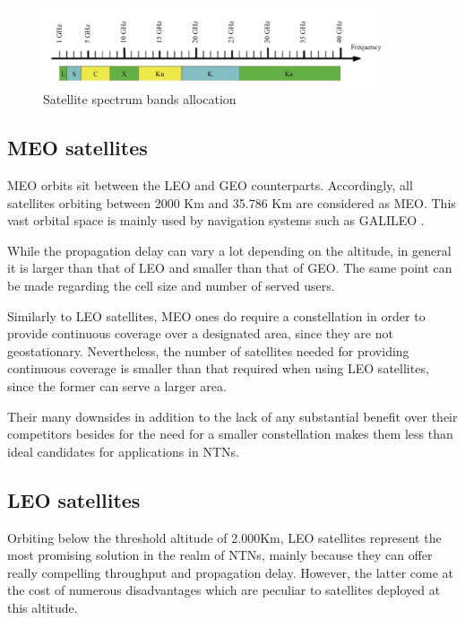 \begin{figure}[ht]
    \centering
    \includegraphics[width=0.9\textwidth]{res/satellite-bands.png}
    \caption{Satellite spectrum bands allocation \cite{advances-comm-sat-sys}}
    \label{fig:satellite-bands}
\end{figure}

\subsection{MEO satellites}
\ac{MEO} orbits sit between the LEO and GEO counterparts. Accordingly, all satellites orbiting between 2000 Km and 35.786 Km are considered as \ac{MEO}. This vast orbital space is mainly used by navigation systems such as GALILEO \cite{types-of-orbits-esa}.

While the propagation delay can vary a lot depending on the altitude, in general it is larger than that of \ac{LEO} and smaller than that of \ac{GEO}. The same point can be made regarding the cell size and number of served users. 

Similarly to \ac{LEO} satellites, \ac{MEO} ones do require a constellation in order to provide continuous coverage over a designated area, since they are not geostationary. Nevertheless, the number of satellites needed for providing continuous coverage is smaller than that required when using \ac{LEO} satellites, since the former can serve a larger area.


Their many downsides in addition to the lack of any substantial benefit over their competitors besides for the need for a smaller constellation makes them less than ideal candidates for applications in \ac{NTN}s.

\subsection{LEO satellites}
\label{sec:leo}
Orbiting below the threshold altitude of 2.000Km, \ac{LEO} satellites represent the most promising solution in the realm of \ac{NTNs}, mainly because they can offer really compelling throughput and propagation delay. However, the latter come at the cost of numerous disadvantages which are peculiar to satellites deployed at this altitude.

